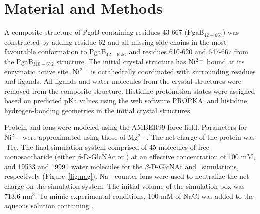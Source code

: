 
\section{Material and Methods}
A composite structure of PgaB containing residues 43-667 (PgaB$_{42-667}$) was constructed by adding residue 62 and all missing side chains in the most favourable conformation to PgaB$_{42-655}$, and residues 610-620 and 647-667 from the PgaB$_{310-672}$ structure. 
The initial crystal structure has Ni$^{2+}$ bound at its enzymatic active site. Ni$^{2+}$ is octahedrally coordinated with surrounding residues and ligands. All ligands and water molecules from the crystal structures were removed from the composite structure. Histidine protonation states were assigned based on predicted pKa values using the web software PROPKA,\cite{Bas:2008ul,Olsson:2011vi,Sondergaard:2011ug} and histidine hydrogen-bonding geometries in the initial crystal structures.

Protein and ions were modeled using the AMBER99 force field.\cite{Cornell:1995td} Parameters for Ni$^{2+}$ were approximated using those of Mg$^{2+}$. The net charge of the protein was -11e. The final simulation system comprised of 45 molecules of free monosaccharide (either $\beta$-D-GlcNAc or \glucosamine) at an effective concentration of 100 mM, and 19533 and 19991 water molecules for the $\beta$-D-GlcNAc and \glucosamine\ simulations, respectively (Figure~\ref{fig:nag}). Na$^{+}$ counter-ions were used to neutralize the net charge on the simulation system. The initial volume of the simulation box was 713.6 nm$^{3}$. To mimic experimental conditions, 100 mM of NaCl was added to the aqueous solution containing \glucosamine. 

